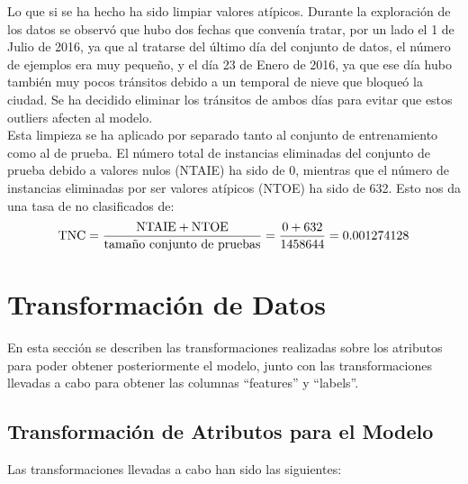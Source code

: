 \documentclass[12pt]{article}
\begin{document}
Lo que si se ha hecho ha sido limpiar valores atípicos. Durante la exploración de los datos se observó que hubo dos fechas que convenía tratar, por un lado el 1 de Julio de 2016, ya que al tratarse del último día del conjunto de datos, el número de ejemplos era muy pequeño, y el día 23 de Enero de 2016, ya que ese día hubo también muy pocos tránsitos debido a un temporal de nieve que bloqueó la ciudad. Se ha decidido eliminar los tránsitos de ambos días para evitar que estos outliers afecten al modelo.\\

Esta limpieza se ha aplicado por separado tanto al conjunto de entrenamiento como al de prueba. El número total de instancias eliminadas del conjunto de prueba debido a valores nulos (NTAIE) ha sido de 0, mientras que el número de instancias eliminadas por ser valores atípicos (NTOE) ha sido de 632. Esto nos da una tasa de no clasificados de:\\

\begin{equation}
    \textnormal{TNC} = \frac{\text{NTAIE} + \text{NTOE}}{\textnormal{tamaño conjunto de pruebas}} = \frac{0 + 632}{1458644} = 0.001274128
    \label{eq:tasa-no-clasificados}
\end{equation}

\section{Transformación de Datos}
En esta sección se describen las transformaciones realizadas sobre los atributos para poder obtener posteriormente el modelo, junto con las transformaciones llevadas a cabo para obtener las columnas ``features'' y ``labels''.\\

\subsection{Transformación de Atributos para el Modelo}

Las transformaciones llevadas a cabo han sido las siguientes:
\end{document}
